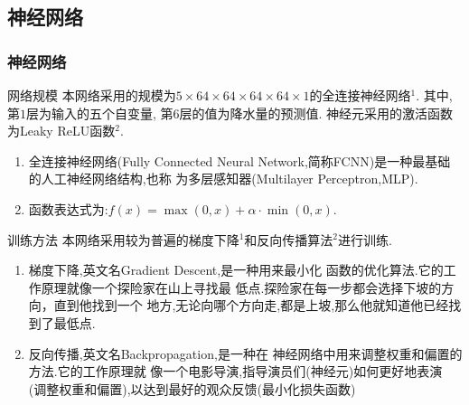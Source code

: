 \documentclass[10pt]{beamer}
\begin{document}
\subsection{神经网络}
\begin{frame}
	\frametitle{神经网络}
	\begin{block}{网络规模}
		本网络采用的规模为$5 \times 64 \times 64 \times 64 \times 64 \times 1$的全连接神经网络$^1$.
		其中, 第$1$层为输入的五个自变量, 第$6$层的值为降水量的预测值.
		神经元采用的激活函数为Leaky ReLU函数$^2$.
		\begin{enumerate}
			\item 全连接神经网络(Fully Connected Neural Network,简称FCNN)是一种最基础的人工神经网络结构,也称
			      为多层感知器(Multilayer Perceptron,MLP).
			\item 函数表达式为:\qquad$f(x)=\max(0, x) + \alpha \cdot \min(0, x)$.
		\end{enumerate}
	\end{block}
	\begin{block}{训练方法}
		本网络采用较为普遍的梯度下降$^1$和反向传播算法$^2$进行训练.
		\begin{enumerate}
			\item 梯度下降,英文名Gradient Descent,是一种用来最小化
			      函数的优化算法.它的工作原理就像一个探险家在山上寻找最
			      低点.探险家在每一步都会选择下坡的方向，直到他找到一个
			      地方,无论向哪个方向走,都是上坡,那么他就知道他已经找到了最低点.
			\item 反向传播,英文名Backpropagation,是一种在
			      神经网络中用来调整权重和偏置的方法.它的工作原理就
			      像一个电影导演,指导演员们(神经元)如何更好地表演
			      (调整权重和偏置),以达到最好的观众反馈(最小化损失函数)
		\end{enumerate}
	\end{block}
\end{frame}
\end{document}
